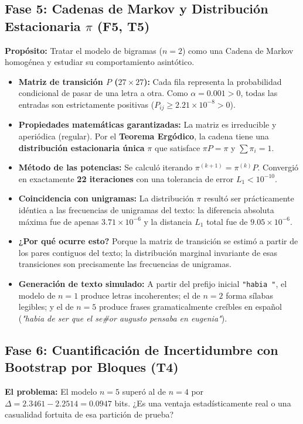 \documentclass[11pt,letterpaper]{article}
\begin{document}
\subsection{Fase 5: Cadenas de Markov y Distribución Estacionaria \texorpdfstring{$\pi$}{pi} (F5, T5)}
\textbf{Propósito:} Tratar el modelo de bigramas ($n=2$) como una Cadena de Markov homogénea y estudiar su comportamiento asintótico.
\begin{itemize}[leftmargin=*, nosep]
    \item \textbf{Matriz de transición $P$ ($27 \times 27$):} Cada fila representa la probabilidad condicional de pasar de una letra a otra. Como $\alpha=0.001 > 0$, todas las entradas son estrictamente positivas ($P_{ij} \ge 2.21 \times 10^{-8} > 0$).
    \item \textbf{Propiedades matemáticas garantizadas:} La matriz es irreducible y aperiódica (regular). Por el \textbf{Teorema Ergódico}, la cadena tiene una \textbf{distribución estacionaria única} $\pi$ que satisface $\pi P = \pi$ y $\sum \pi_i = 1$.
    \item \textbf{Método de las potencias:} Se calculó iterando $\pi^{(k+1)} = \pi^{(k)} P$. Convergió en exactamente \textbf{22 iteraciones} con una tolerancia de error $L_1 < 10^{-10}$.
    \item \textbf{Coincidencia con unigramas:} La distribución $\pi$ resultó ser prácticamente idéntica a las frecuencias de unigramas del texto: la diferencia absoluta máxima fue de apenas $3.71 \times 10^{-6}$ y la distancia $L_1$ total fue de $9.05 \times 10^{-6}$.
    \item \textbf{¿Por qué ocurre esto?} Porque la matriz de transición se estimó a partir de los pares contiguos del texto; la distribución marginal invariante de esas transiciones son precisamente las frecuencias de unigramas.
    \item \textbf{Generación de texto simulado:} A partir del prefijo inicial \texttt{"habia "}, el modelo de $n=1$ produce letras incoherentes; el de $n=2$ forma sílabas legibles; y el de $n=5$ produce frases gramaticalmente creíbles en español (\textit{"habia de ser que el se\#or augusto pensaba en eugenia"}).
\end{itemize}

\subsection{Fase 6: Cuantificación de Incertidumbre con Bootstrap por Bloques (T4)}
\textbf{El problema:} El modelo $n=5$ superó al de $n=4$ por $\Delta = 2.3461 - 2.2514 = 0.0947$ bits. ¿Es una ventaja estadísticamente real o una casualidad fortuita de esa partición de prueba?
\end{document}
